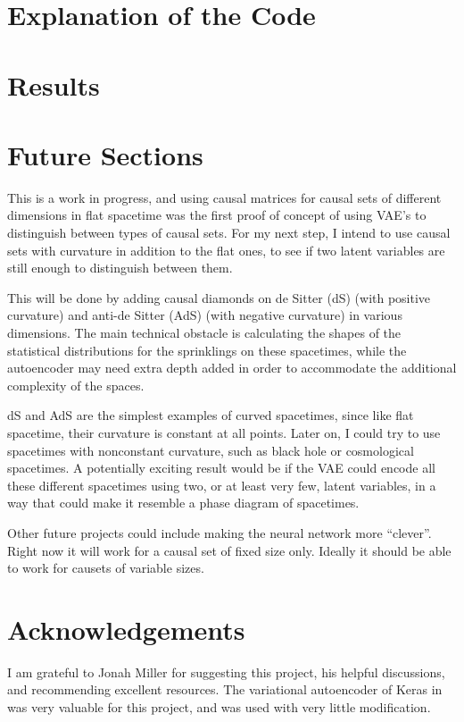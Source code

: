 \documentclass[letterpaper,10pt]{article}
\begin{document}
\section{Explanation of the Code}



\section{Results} \label{results}

\section{Future Sections} \label{future}

This is a work in progress, and using causal matrices for causal sets of different dimensions in flat spacetime was the first proof of concept of using 
VAE's to distinguish between types of causal sets.  For my next step, I intend to use causal sets with curvature in addition to the flat ones, to see if 
two latent variables are still enough to distinguish between them.  

This will be done by adding causal diamonds on de Sitter (dS) (with positive curvature) and anti-de Sitter (AdS) (with negative curvature) 
in various dimensions.  The main technical obstacle is calculating the 
shapes of the statistical distributions for the sprinklings on these spacetimes, while the autoencoder may need extra depth added in order to accommodate 
the additional complexity of the spaces.

dS and AdS are the simplest examples of curved spacetimes, since like flat spacetime, their curvature is constant at all points.  Later on, I could 
try to use spacetimes with nonconstant curvature, such as black hole or cosmological spacetimes.  A potentially exciting result would be if the VAE 
could encode all these different spacetimes using two, or at least very few, latent variables, in a way that could make it resemble a phase diagram of 
spacetimes.

Other future projects could include making the neural network more ``clever''.  Right now it will work for a causal set of fixed size only.  Ideally 
it should be able to work for causets of variable sizes.



\section{Acknowledgements}
I am grateful to Jonah Miller for suggesting this project, his helpful discussions, and recommending excellent resources.  
The variational autoencoder of Keras in \cite{kerasauto} was very valuable for this project, and was used with very little modification.
\end{document}
